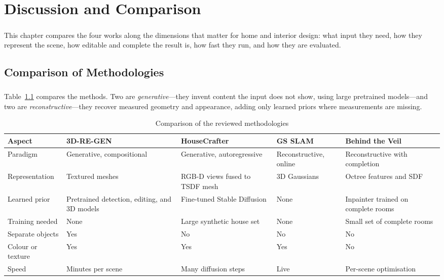 \documentclass[12pt,a4paper,final]{extreport}
\begin{document}
\chapter{Discussion and Comparison}

\paragraph{} This chapter compares the four works along the dimensions that matter for home and interior design: what input they need, how they represent the scene, how editable and complete the result is, how fast they run, and how they are evaluated.

\section{Comparison of Methodologies}

\paragraph{} Table~\ref{tab:method_cmp} compares the methods. Two are \emph{generative}---they invent content the input does not show, using large pretrained models---and two are \emph{reconstructive}---they recover measured geometry and appearance, adding only learned priors where measurements are missing.

{\renewcommand{\arraystretch}{1.15}
\begin{table}[htbp]
\centering
\caption{Comparison of the reviewed methodologies}\label{tab:method_cmp}
\small
\begin{tabularx}{\textwidth}{|p{2.6cm}|X|X|X|X|}
\hline
\textbf{Aspect} & \textbf{3D-RE-GEN} & \textbf{HouseCrafter} & \textbf{GS SLAM} & \textbf{Behind the Veil} \\ \hline
Paradigm & Generative, compositional & Generative, autoregressive & Reconstructive, online & Reconstructive with completion \\ \hline
Representation & Textured meshes & RGB-D views fused to TSDF mesh & 3D Gaussians & Octree features and SDF \\ \hline
Learned prior & Pretrained detection, editing, and 3D models & Fine-tuned Stable Diffusion & None & Inpainter trained on complete rooms \\ \hline
Training needed & None & Large synthetic house set & None & Small set of complete rooms \\ \hline
Separate objects & Yes & No & No & No \\ \hline
Colour or texture & Yes & Yes & Yes & No \\ \hline
Speed & Minutes per scene & Many diffusion steps & Live & Per-scene optimisation \\ \hline
\end{tabularx}
\end{table}}
\end{document}
